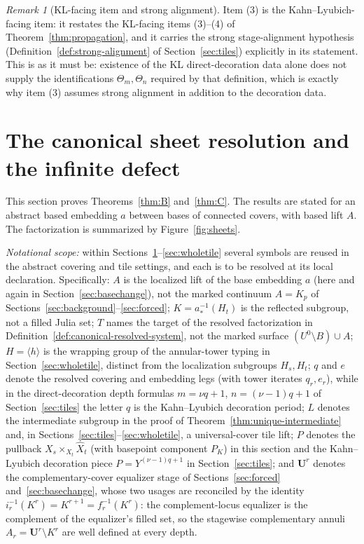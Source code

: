 \documentclass[11pt,reqno]{amsart}
\theoremstyle{definition}
\theoremstyle{remark}
\newtheorem{remark}[theorem]{Remark}
\begin{document}
\begin{remark}[KL-facing item and strong alignment]
\label{rem:realization-alignment}
Item (3) is the Kahn--Lyubich-facing item: it restates the KL-facing
items (3)--(4) of Theorem~\ref{thm:propagation}, and it carries the
strong stage-alignment hypothesis
(Definition~\ref{def:strong-alignment} of Section~\ref{sec:tiles})
explicitly in its statement.  This is as it must be: existence of the
KL direct-decoration data alone does not supply the identifications
\(\Theta_m,\Theta_n\) required by that definition, which is exactly
why item (3) assumes strong alignment in addition to the decoration
data.
\end{remark}

\section{The canonical sheet resolution and the infinite defect}
\label{sec:resolution}



This section proves Theorems~\ref{thm:B} and~\ref{thm:C}.  The results
are stated for an abstract based embedding $a$ between bases of
connected covers, with based lift $A$.  The factorization is summarized
by Figure~\ref{fig:sheets}.

\emph{Notational scope:} within
Sections~\ref{sec:resolution}--\ref{sec:wholetile} several symbols are
reused in the abstract covering and tile settings, and each is to be
resolved at its local declaration.  Specifically: $A$ is the localized
lift of the base embedding $a$ (here and again in
Section~\ref{sec:basechange}), not the marked continuum $A=K_{p}$ of
Sections~\ref{sec:background}--\ref{sec:forced}; $K=a_{*}^{-1}(H_{t})$
is the reflected subgroup, not a filled Julia set; $T$ names the target
of the resolved factorization in
Definition~\ref{def:canonical-resolved-system}, not the marked surface
$(U^{0}\setminus B)\cup A$; $H=\langle h\rangle$ is the wrapping group
of the annular-tower typing in Section~\ref{sec:wholetile}, distinct
from the localization subgroups $H_{s},H_{t}$; $q$ and $e$ denote the
resolved covering and embedding legs (with tower iterates
$q_{r},e_{r}$), while in the direct-decoration depth formulas
$m=\nu q+1$, $n=(\nu-1)q+1$ of Section~\ref{sec:tiles} the letter $q$
is the Kahn--Lyubich decoration period; $L$ denotes the intermediate
subgroup in the proof of Theorem~\ref{thm:unique-intermediate} and, in
Sections~\ref{sec:tiles}--\ref{sec:wholetile}, a universal-cover tile
lift; $P$ denotes the pullback $X_{s}\times_{X_{t}}\widehat X_{t}$
(with basepoint component $P_{K}$) in this section and the
Kahn--Lyubich decoration piece $P=Y^{(\nu-1)q+1}$ in
Section~\ref{sec:tiles}; and $\mathbf U^{r}$ denotes the
complementary-cover equalizer stage of Sections~\ref{sec:forced}
and~\ref{sec:basechange}, whose two usages are reconciled by the
identity $i_{r}^{-1}(K^{r})=K^{r+1}=f_{r}^{-1}(K^{r})$: the
complement-locus equalizer is the complement of the equalizer's filled
set, so the stagewise complementary annuli
$A_{r}=\mathbf U^{r}\setminus K^{r}$ are well defined at every depth.
\end{document}
